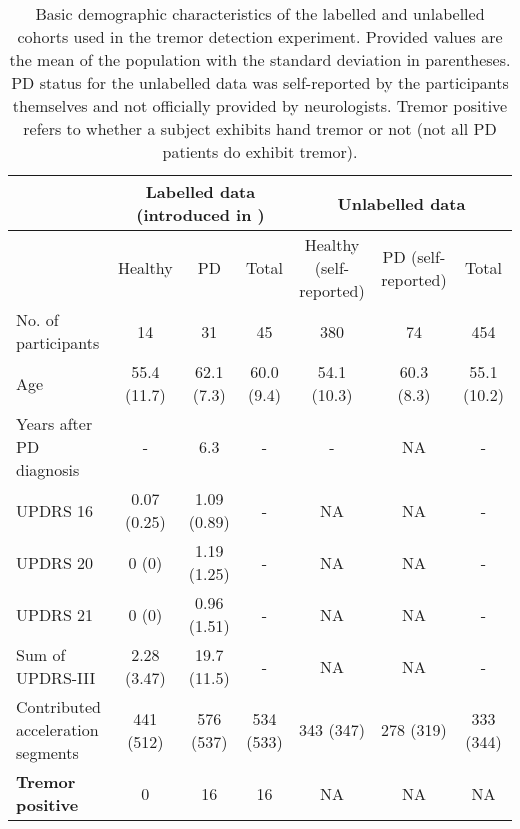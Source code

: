 \documentclass[journal,twoside,web]{ieeecolor}
\begin{document}
\begin{table*}[!h]
	\centering
	\caption{Basic demographic characteristics of the labelled and unlabelled
		cohorts used in the tremor detection experiment.
                Provided values are the mean of the population with the standard
                deviation in parentheses.
		PD status for the unlabelled data was self-reported by the participants
		themselves and not officially provided by neurologists. Tremor
              positive refers to whether a subject exhibits hand tremor or not (not all
            PD patients do exhibit tremor).}
	\begin{tabular}{l|ccc|ccc}
		\toprule
		& \multicolumn{3}{c}{Labelled data (introduced in
        \cite{alpapado2019tremor})} & \multicolumn{3}{c}{Unlabelled data} \\
		\midrule
                & Healthy & PD & Total & Healthy (self-reported) & PD
          (self-reported) & Total\\
		\midrule
          No. of participants & 14 & 31 & 45 & 380 & 74 & 454\\
                Age & 55.4 (11.7) & 62.1 (7.3) & 60.0 (9.4) & 54.1 (10.3) & 60.3
                (8.3) & 55.1 (10.2)\\
                Years after PD diagnosis & - & 6.3 & - & - & NA & -\\ 
                UPDRS 16 & 0.07 (0.25) & 1.09 (0.89) & - & NA & NA & - \\
                UPDRS 20 & 0 (0) & 1.19 (1.25) & - & NA & NA & -\\
                UPDRS 21 & 0 (0) & 0.96 (1.51) & - & NA & NA & -\\
                Sum of UPDRS-III & 2.28 (3.47) & 19.7 (11.5) & - & NA & NA & -\\
                Contributed acceleration segments & 441 (512) & 576 (537) & 534 (533) & 343 (347) & 278
                (319) & 333 (344)\\
		\midrule
                \textbf{Tremor positive} & 0 & 16 & 16 & NA & NA & NA \\
		\bottomrule
	\end{tabular}
	\label{tab:tremor_demographics}
\end{table*}
\end{document}
